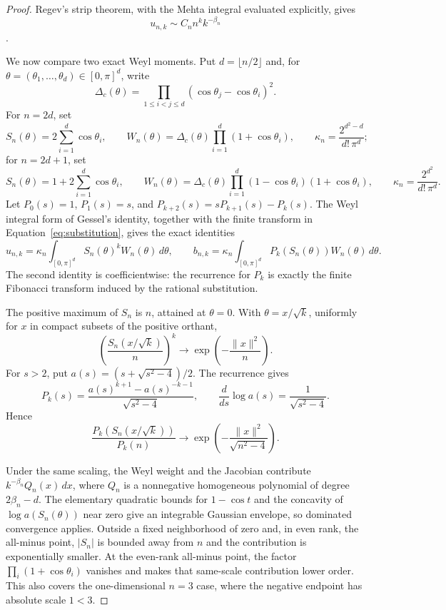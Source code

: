 \documentclass[11pt]{article}
\theoremstyle{definition}
\begin{document}
\begin{proof}
Regev's strip theorem, with the Mehta integral evaluated explicitly, gives
\begin{equation}\label{eq:regev-leading}
 u_{n,k}\sim C_n n^k k^{-\beta_n}
\end{equation}
\cite{Regev1981,Matsumoto2008}.

We now compare two exact Weyl moments.  Put $d=\lfloor n/2\rfloor$ and, for
$\theta=(\theta_1,\ldots,\theta_d)\in[0,\pi]^d$, write
\[
 \Delta_c(\theta)=\prod_{1\le i<j\le d}
   (\cos\theta_j-\cos\theta_i)^2.
\]
For $n=2d$, set
\[
 S_n(\theta)=2\sum_{i=1}^d\cos\theta_i,
 \qquad
 W_n(\theta)=\Delta_c(\theta)\prod_{i=1}^d(1+\cos\theta_i),
 \qquad
 \kappa_n=\frac{2^{d^2-d}}{d!\,\pi^d};
\]
for $n=2d+1$, set
\[
 S_n(\theta)=1+2\sum_{i=1}^d\cos\theta_i,
 \qquad
 W_n(\theta)=\Delta_c(\theta)
   \prod_{i=1}^d(1-\cos\theta_i)(1+\cos\theta_i),
 \qquad
 \kappa_n=\frac{2^{d^2}}{d!\,\pi^d}.
\]
Let $P_0(s)=1$, $P_1(s)=s$, and
$P_{k+2}(s)=sP_{k+1}(s)-P_k(s)$.  The Weyl integral form of Gessel's identity,
together with the finite transform in Equation~\eqref{eq:substitution}, gives
the exact identities
\[
 u_{n,k}=\kappa_n\int_{[0,\pi]^d}S_n(\theta)^kW_n(\theta)\,d\theta,
 \qquad
 b_{n,k}=\kappa_n\int_{[0,\pi]^d}P_k(S_n(\theta))W_n(\theta)\,d\theta.
\]
The second identity is coefficientwise: the recurrence for $P_k$ is exactly
the finite Fibonacci transform induced by the rational substitution.

The positive maximum of $S_n$ is $n$, attained at $\theta=0$.  With
$\theta=x/\sqrt{k}$, uniformly for $x$ in compact subsets of the positive
orthant,
\[
 \left(\frac{S_n(x/\sqrt{k})}{n}\right)^k
   \longrightarrow \exp\!\left(-\frac{\lVert x\rVert^2}{n}\right).
\]
For $s>2$, put $a(s)=(s+\sqrt{s^2-4})/2$.  The recurrence gives
\[
 P_k(s)=\frac{a(s)^{k+1}-a(s)^{-k-1}}{\sqrt{s^2-4}},
 \qquad
 \frac{d}{ds}\log a(s)=\frac1{\sqrt{s^2-4}}.
\]
Hence
\[
 \frac{P_k(S_n(x/\sqrt{k}))}{P_k(n)}
   \longrightarrow
   \exp\!\left(-\frac{\lVert x\rVert^2}{\sqrt{n^2-4}}\right).
\]

Under the same scaling, the Weyl weight and the Jacobian contribute
$k^{-\beta_n}Q_n(x)\,dx$, where $Q_n$ is a nonnegative homogeneous polynomial
of degree $2\beta_n-d$.  The elementary quadratic bounds for $1-\cos t$ and
the concavity of $\log a(S_n(\theta))$ near zero give an integrable Gaussian
envelope, so dominated convergence applies.  Outside a fixed neighborhood of
zero and, in even rank, the all-minus point, $|S_n|$ is bounded away from $n$
and the contribution is exponentially smaller.  At the even-rank all-minus
point, the factor $\prod_i(1+\cos\theta_i)$ vanishes and makes that
same-scale contribution lower order.  This also covers the one-dimensional $n=3$ case,
where the negative endpoint has absolute scale $1<3$.


\end{proof}
\end{document}
